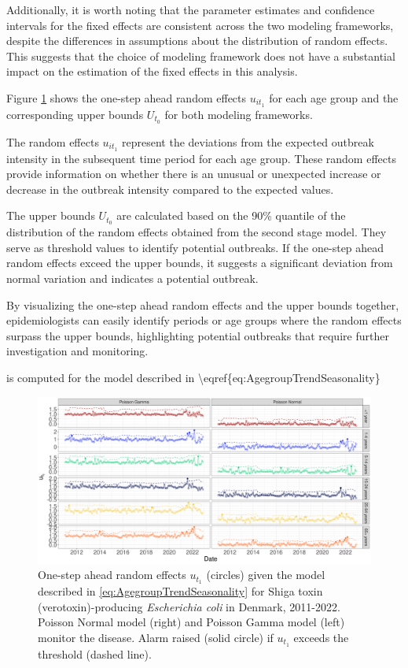 \documentclass[a4paper,twoside,11pt]{report} %
\theoremstyle{definition}
\theoremstyle{definition}
\theoremstyle{definition}
\theoremstyle{definition}
\theoremstyle{remark}
\begin{document}
Additionally, it is worth noting that the parameter estimates and confidence intervals for the fixed effects are consistent across the two modeling frameworks, despite the differences in assumptions about the distribution of random effects. This suggests that the choice of modeling framework does not have a substantial impact on the estimation of the fixed effects in this analysis.

Figure \ref{fig:CompareNovelSTEC} shows the one-step ahead random effects \(u_{i{t_1}}\) for each age group and the corresponding upper bounds \(U_{t_0}\) for both modeling frameworks.

The random effects \(u_{i{t_1}}\) represent the deviations from the expected outbreak intensity in the subsequent time period for each age group. These random effects provide information on whether there is an unusual or unexpected increase or decrease in the outbreak intensity compared to the expected values.

The upper bounds \(U_{t_0}\) are calculated based on the 90\% quantile of the distribution of the random effects obtained from the second stage model. They serve as threshold values to identify potential outbreaks. If the one-step ahead random effects exceed the upper bounds, it suggests a significant deviation from normal variation and indicates a potential outbreak.

By visualizing the one-step ahead random effects and the upper bounds together, epidemiologists can easily identify periods or age groups where the random effects surpass the upper bounds, highlighting potential outbreaks that require further investigation and monitoring.

is computed for the model described in \textbackslash eqref\{eq:AgegroupTrendSeasonality\}



\begin{figure}[H]
\includegraphics[width=1\linewidth]{../figures/Compare_novel_STEC} \caption{One-step ahead random effects \(u_{t_1}\) (circles) given the model described in \eqref{eq:AgegroupTrendSeasonality} for Shiga toxin (verotoxin)-producing \textit{Escherichia coli} in Denmark, 2011-2022. Poisson Normal model (right) and Poisson Gamma model (left) monitor the disease. Alarm raised (solid circle) if \(u_{t_1}\) exceeds the threshold (dashed line).}\label{fig:CompareNovelSTEC}
\end{figure}
\end{document}
